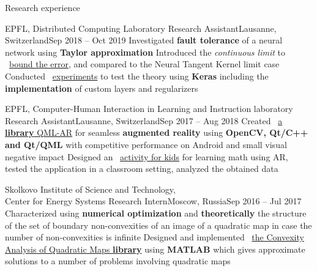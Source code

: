 \documentclass{resume} %
\newcommand*{\img}[1]{%
	\raisebox{-.02\baselineskip}{%
		\texttt{[image: \#1]}%
	}%
}
\newcommand*{\emoji}[1]{\img{./emoji/#1.png}}
\newcommand{\mylink}{{\color{gray}\faExternalLink}}
\begin{document}
\begin{rSection}{Research experience}
	\begin{rSubsection}{EPFL, Distributed Computing Laboratory \emoji{flag-ch}}{Research Assistant}{Lausanne, Switzerland}{Sep 2018 -- Oct 2019}
		\myitem Investigated {\bf fault tolerance} of a neural network using {\bf Taylor approximation}
		\myitem Introduced the {\em continuous limit} to \mylink~\href{https://arxiv.org/abs/1902.01686}{bound the error}, and compared to the Neural Tangent Kernel limit case
		\myitem Conducted \mylink~\href{https://github.com/LPD-EPFL/ProbabilisticFaultToleranceNNs}{experiments} to test the theory using {\bf Keras} including the {\bf implementation} of custom layers and regularizers
	\end{rSubsection}

	\begin{rSubsection}{EPFL, Computer-Human Interaction in Learning and Instruction laboratory \emoji{flag-ch}}{Research Assistant}{Lausanne, Switzerland}{Sep 2017 -- Aug 2018}
		\myitem Created \mylink~\href{https://github.com/chili-epfl/qml-ar}{a {\color{black} \bf library} QML-AR} for seamless {\bf augmented reality} using {\bf OpenCV, Qt/C++ and Qt/QML} with competitive performance on Android and small visual negative impact
		\myitem Designed an \mylink~\href{https://youtu.be/B4-2qYsAKH4}{activity for kids} for learning math using AR, tested the application in a classroom setting, analyzed the obtained data
	\end{rSubsection}

	\begin{rSubsection}{Skolkovo Institute of Science and Technology, \\Center for Energy Systems \emoji{flag-ru}}{Research Intern}{Moscow, Russia}{Sep 2016 -- Jul 2017}
		\myitem Characterized using {\bf numerical optimization} and {\bf theoretically} the structure of the set of boundary non-convexities of an image of a quadratic map in case the number of non-convexities is infinite
		\myitem Designed and implemented \mylink~\href{https://github.com/sergeivolodin/CAQM}{the Convexity Analysis of Quadratic Maps {\bf \color{black} library}} using {\bf MATLAB} which gives approximate solutions to a number of problems involving quadratic maps
	\end{rSubsection}



\end{rSection}
\end{document}
